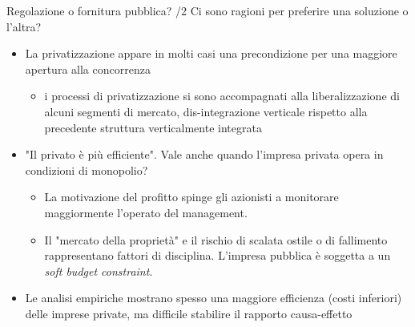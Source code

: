 \documentclass[aspectratio=149,11pt]{beamer}
\begin{document}
\begin{frame}{Regolazione o fornitura pubblica? /2}
Ci sono ragioni per preferire una soluzione o l'altra?
\begin{itemize}
\item La privatizzazione appare in molti casi una precondizione per una maggiore
apertura alla concorrenza
\begin{itemize}
\item i processi di privatizzazione si sono accompagnati alla liberalizzazione
di alcuni segmenti di mercato, dis-integrazione verticale rispetto alla
precedente struttura verticalmente integrata
\end{itemize}
\item "Il privato è più efficiente". Vale anche quando l'impresa privata opera in
condizioni di monopolio?
\begin{itemize}
\item La motivazione del profitto spinge gli azionisti a monitorare maggiormente
l'operato del management.
\item Il "mercato della proprietà" e il rischio di scalata ostile o di
fallimento rappresentano fattori di disciplina. L'impresa pubblica è
soggetta a un \emph{soft budget constraint}.
\end{itemize}
\item Le analisi empiriche mostrano spesso una maggiore efficienza (costi
inferiori) delle imprese private, ma difficile stabilire il rapporto
causa-effetto
\end{itemize}
\end{frame}
\end{document}
